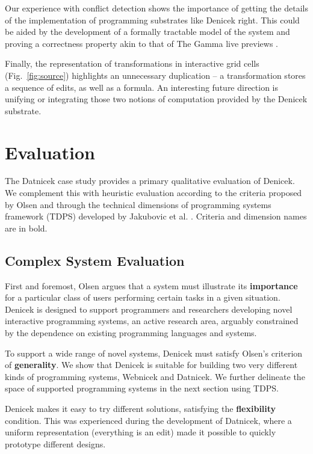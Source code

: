 \documentclass[sigconf,anonymous,screen]{acmart}
\begin{document}
Our experience with conflict detection shows the importance of getting the details of the
implementation of programming substrates like Denicek right. This could be aided by the
development of a formally tractable model of the system and proving a correctness property
akin to that of The Gamma live previews \cite{petricek-2020-live}.

Finally, the representation of transformations in interactive grid cells (Fig.~\ref{fig:source})
highlights an unnecessary duplication -- a transformation stores a sequence of edits, as well as a formula.
An interesting future direction is unifying or integrating those two notions of computation
provided by the Denicek substrate.

\section{Evaluation}
\label{sec:eval}

The Datnicek case study provides a primary qualitative evaluation of Denicek. We complement this
with heuristic evaluation according to the criteria proposed by Olsen \cite{olsen-2007-evaluation}
and through the technical dimensions of programming systems framework (TDPS) developed by Jakubovic
et al. \cite{jakubovic-2023-techdims}. Criteria and dimension names are in bold.

\subsection{Complex System Evaluation}
First and foremost, Olsen \cite{olsen-2007-evaluation} argues that a system must illustrate
its \textbf{importance} for a particular class of users performing certain tasks in a given situation.
Denicek is designed to support programmers and researchers developing novel interactive programming systems,
an active research area, arguably constrained by the dependence on existing programming languages and systems.

To support a wide range of novel systems, Denicek must satisfy Olsen's criterion of \textbf{generality}.
We show that Denicek is suitable for building two very different kinds of programming systems, Webnicek
and Datnicek. We further delineate the space of supported programming systems in the next section using TDPS.

Denicek makes it easy to try different solutions, satisfying the \textbf{flexibility} condition.
This was experienced during the development of Datnicek, where a uniform representation (everything
is an edit) made it possible to quickly prototype different designs.
\end{document}
